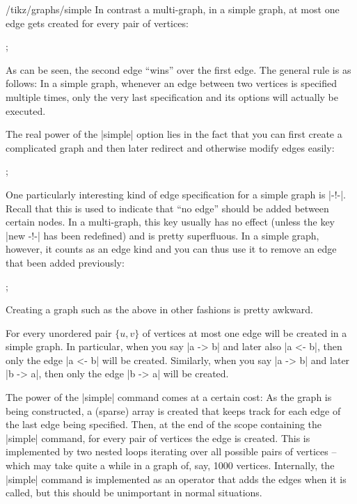 \begin{key}{/tikz/graphs/simple}
    In contrast a multi-graph, in a simple graph, at most one edge gets created
    for every pair of vertices:
\begin{codeexample}[preamble={\usetikzlibrary{graphs}}]
\tikz {};
\end{codeexample}
    As can be seen, the second edge ``wins'' over the first edge. The general
    rule is as follows: In a simple graph, whenever an edge between two
    vertices is specified multiple times, only the very last specification and
    its options will actually be executed.

    The real power of the |simple| option lies in the fact that you can first
    create a complicated graph and then later redirect and otherwise modify
    edges easily:
\begin{codeexample}[preamble={\usetikzlibrary{graphs}}]
\tikz {};
\end{codeexample}

    One particularly interesting kind of edge specification for a simple graph
    is |-!-|. Recall that this is used to indicate that ``no edge'' should be
    added between certain nodes. In a multi-graph, this key usually has no
    effect (unless the key |new -!-| has been redefined) and is pretty
    superfluous. In a simple graph, however, it counts as an edge kind and you
    can thus use it to remove an edge that been added previously:
\begin{codeexample}[preamble={\usetikzlibrary{graphs.standard}}]
\tikz {};
\end{codeexample}

    Creating a graph such as the above in other fashions is pretty awkward.

    For every unordered pair $\{u,v\}$ of vertices at most one edge will be
    created in a simple graph. In particular, when you say |a -> b| and later
    also |a <- b|, then only the edge |a <- b| will be created. Similarly, when
    you say |a -> b| and later |b -> a|, then only the edge |b -> a| will be
    created.

    The power of the |simple| command comes at a certain cost: As the graph is
    being constructed, a (sparse) array is created that keeps track for each
    edge of the last edge being specified. Then, at the end of the scope
    containing the |simple| command, for every pair of vertices the edge is
    created. This is implemented by two nested loops iterating over all
    possible pairs of vertices -- which may take quite a while in a graph of,
    say, 1000 vertices. Internally, the |simple| command is implemented as an
    operator that adds the edges when it is called, but this should be
    unimportant in normal situations.
\end{key}


